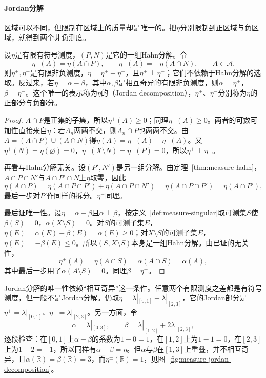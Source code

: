 \paragraph{Jordan分解}
区域可以不同，但限制在区域上的质量却是唯一的。把$\eta$分别限制到正区域与负区域，就得到两个非负测度。

\begin{theorem}[Jordan分解]
\label{thm:measure-jordan}
设$\eta$是有限有符号测度，$(P,N)$是它的一组Hahn分解。令
\[
 \eta^+(A)=\eta(A\cap P),\qquad \eta^-(A)=-\eta(A\cap N),\qquad A\in\mathcal A .
\]
则$\eta^+,\eta^-$是有限非负测度，$\eta=\eta^+-\eta^-$，且$\eta^+\perp\eta^-$；它们不依赖于Hahn分解的选取。反过来，若$\eta=\alpha-\beta$，其中$\alpha,\beta$是相互奇异的有限非负测度，则$\alpha=\eta^+$，$\beta=\eta^-$。这个唯一的表示称为$\eta$的（Jordan decomposition），$\eta^+$、$\eta^-$分别称为$\eta$的正部分与负部分。
\end{theorem}

\begin{proof}
$A\cap P$是正集的子集，所以$\eta^+(A)\ge0$；同理$\eta^-(A)\ge0$。两者的可数可加性直接来自$\eta$：若$A_n$两两不交，则$A_n\cap P$也两两不交。由$A=(A\cap P)\cup(A\cap N)$得$\eta(A)=\eta^+(A)-\eta^-(A)$。又$\eta^+(N)=\eta(\varnothing)=0$，$\eta^-(X\setminus N)=\eta^-(P)=0$，所以$\eta^+\perp\eta^-$。

再看与Hahn分解无关。设$(P',N')$是另一组分解。由定理~\ref{thm:measure-hahn}，$A\cap P\cap N'$与$A\cap P'\cap N$上$\eta$取零，因此
\[
 \eta(A\cap P)=\eta(A\cap P\cap P')+\eta(A\cap P\cap N')=\eta(A\cap P\cap P')=\eta(A\cap P'),
\]
最后一步对$P'$作同样的拆分。$\eta^-$同理。

最后证唯一性。设$\eta=\alpha-\beta$且$\alpha\perp\beta$，按定义~\ref{def:measure-singular}取可测集$S$使$\beta(S)=0$，$\alpha(X\setminus S)=0$。对$S$的可测子集$E$，$\eta(E)=\alpha(E)-\beta(E)=\alpha(E)\ge0$；对$X\setminus S$的可测子集$E$，$\eta(E)=-\beta(E)\le0$。所以$(S,X\setminus S)$本身是一组Hahn分解。由已证的无关性，
\[
 \eta^+(A)=\eta(A\cap S)=\alpha(A\cap S)=\alpha(A),
\]
其中最后一步用了$\alpha(A\setminus S)=0$。同理$\beta=\eta^-$。
\end{proof}

Jordan分解的唯一性依赖“相互奇异”这一条件。任意两个有限测度之差都是有符号测度，但一般不是Jordan分解。仍取$\eta=\lambda|_{[0,1]}-\lambda|_{[2,3]}$，它的Jordan部分是$\eta^+=\lambda|_{[0,1]}$、$\eta^-=\lambda|_{[2,3]}$。另一方面，令
\[
 \alpha=\lambda|_{[0,3]},\qquad \beta=\lambda|_{[1,2]}+2\lambda|_{[2,3]},
\]
逐段检查：在$[0,1]$上$\alpha-\beta$的系数为$1-0=1$，在$[1,2]$上为$1-1=0$，在$[2,3]$上为$1-2=-1$，所以同样有$\alpha-\beta=\eta$。但$\alpha$与$\beta$在$[1,3]$上重叠，并不相互奇异，且$\alpha(\mathbb R)=\beta(\mathbb R)=3$，而$\eta^\pm(\mathbb R)=1$，见图~\ref{fig:measure-jordan-decomposition}。


